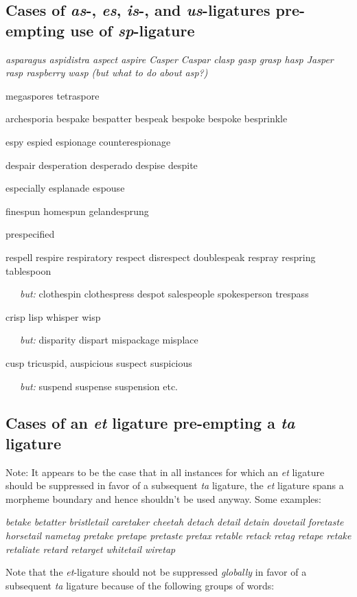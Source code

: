 \subsection*{Cases of \emph{as}-, \emph{\ebg es}, \emph{is}-, and \emph{us}-ligatures pre-empting use of  \emph{sp}-ligature}

\bgroup \em
asparagus aspidistra aspect aspire Casper Caspar clasp gasp grasp hasp Jasper rasp raspberry wasp \emph{(but what to do about} asp\emph{?)}

megaspores tetraspore

{\ebg
archesporia bespake bespatter bespeak bespoke bespoke besprinkle

espy espied espionage counterespionage

despair desperation desperado
despise despite

especially
esplanade
espouse

finespun homespun
gelandesprung 

prespecified

respell respire respiratory 
respect disrespect
doublespeak
respray respring 
tablespoon


\ \  \ \emph{but:} clothespin clothespress despot salespeople spokesperson trespass 
}

crisp lisp whisper wisp

\ \ \ \emph{but:} disparity dispart mispackage misplace

cusp tricuspid, auspicious suspect suspicious 

\ \ \ \emph{but:} suspend suspense suspension etc.

\egroup


\subsection*{Cases of an \emph{et} ligature pre-empting a \emph{ta} ligature}

Note: It appears to be the case that in all instances for which an \emph{et} ligature should be suppressed in favor of a subsequent \emph{ta} ligature, the \emph{et} ligature spans a morpheme boundary and hence shouldn't be used anyway. Some examples:

\bgroup \em
betake betatter bristletail caretaker cheetah 
detach detail detain dovetail 
foretaste horsetail nametag pretake
pretape pretaste pretax retable retack
retag retape retake retaliate retard retarget
whitetail wiretap

\egroup
\medskip
Note that the \emph{et}-ligature should not be suppressed \emph{globally} in favor of a subsequent \emph{ta} ligature because of the following groups of words:

